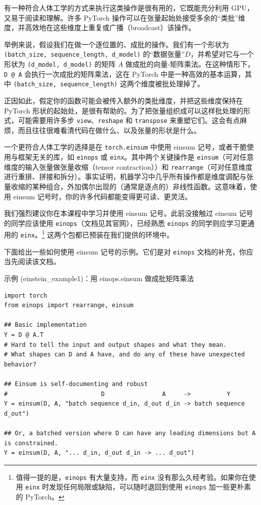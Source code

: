 有一种符合人体工学的方式来执行这类操作是很有用的，它既能充分利用 GPU，又易于阅读和理解。许多 PyTorch 操作可以在张量起始处接受多余的“类批”维度，并高效地在这些维度上重复或广播（broadcast）该操作。

举例来说，假设我们在做一个逐位置的、成批的操作。我们有一个形状为 \texttt{(batch\_size, sequence\_length, d\_model)} 的“数据张量”$D$，并希望对它与一个形状为 \texttt{(d\_model, d\_model)} 的矩阵 $A$ 做成批的向量-矩阵乘法。在这种情形下，\texttt{D @ A} 会执行一次成批的矩阵乘法，这在 PyTorch 中是一种高效的基本运算，其中 \texttt{(batch\_size, sequence\_length)} 这两个维度被批处理掉了。

正因如此，假定你的函数可能会被传入额外的类批维度，并把这些维度保持在 PyTorch 形状的起始处，是很有帮助的。为了把张量组织成可以这样批处理的形式，可能需要用许多步 \texttt{view}、\texttt{reshape} 和 \texttt{transpose} 来重塑它们。这会有点麻烦，而且往往很难看清代码在做什么、以及张量的形状是什么。

一个更符合人体工学的选择是在 \texttt{torch.einsum} 中使用 einsum 记号，或者干脆使用与框架无关的库，如 \texttt{einops} 或 \texttt{einx}。其中两个关键操作是 \texttt{einsum}（可对任意维度的输入张量做张量收缩（tensor contraction））和 \texttt{rearrange}（可对任意维度进行重排、拼接和拆分）。事实证明，机器学习中几乎所有操作都是维度调配与张量收缩的某种组合，外加偶尔出现的（通常是逐点的）非线性函数。这意味着，使用 einsum 记号时，你的许多代码都能变得更可读、更灵活。

我们强烈建议你在本课程中学习并使用 einsum 记号。此前没接触过 einsum 记号的同学应该使用 \texttt{einops}（文档见其官网），已经熟悉 \texttt{einops} 的同学则应学习更通用的 \texttt{einx}。\footnote{值得一提的是，\texttt{einops} 有大量支持，而 \texttt{einx} 没有那么久经考验。如果你在使用 \texttt{einx} 时发现任何局限或缺陷，可以随时退回到使用 \texttt{einops} 加一些更朴素的 PyTorch。} 这两个包都已预装在我们提供的环境中。

下面给出一些如何使用 einsum 记号的示例。它们是对 \texttt{einops} 文档的补充，你应当先阅读该文档。

\begin{tipbox}{示例 (einstein\_example1)：用 einops.einsum 做成批矩阵乘法}
\begin{lstlisting}
import torch
from einops import rearrange, einsum

## Basic implementation
Y = D @ A.T
# Hard to tell the input and output shapes and what they mean.
# What shapes can D and A have, and do any of these have unexpected behavior?

## Einsum is self-documenting and robust
#                          D                A     ->          Y
Y = einsum(D, A, "batch sequence d_in, d_out d_in -> batch sequence d_out")

## Or, a batched version where D can have any leading dimensions but A is constrained.
Y = einsum(D, A, "... d_in, d_out d_in -> ... d_out")
\end{lstlisting}
\end{tipbox}

